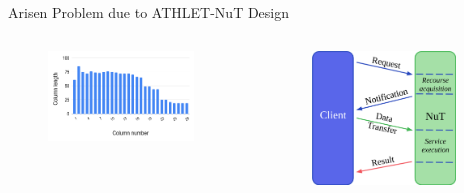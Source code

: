 \begin{frame}[t]{Arisen Problem due to ATHLET-NuT Design}
    \begin{columns}
        \begin{figure}[t]
            \centering
            \includegraphics[width=0.9\textwidth]{figures/matrix-compression-2.png}
        \end{figure}
        \begin{figure}[t]
            \centering
            \includegraphics[width=0.9\textwidth]{figures/presentation-figures/handshake.png}
        \end{figure}
    \end{columns}

\end{frame}